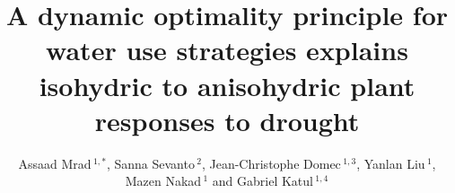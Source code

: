 \documentclass[utf8]{frontiersSCNS} %
\def\firstAuthorLast{Mrad {et~al.}} %
\def\Authors{Assaad Mrad\,$^{1,*}$, Sanna Sevanto\,$^{2}$, Jean-Christophe Domec\,$^{1,3}$, Yanlan Liu\,$^{1}$, Mazen Nakad\,$^{1}$ and Gabriel Katul\,$^{1,4}$}
\begin{document}
\onecolumn
{}

\title[Dynamic optimality principle for water use strategies]{A dynamic optimality principle for water use strategies explains isohydric to anisohydric plant responses to drought} 

\author[\firstAuthorLast ]{\Authors} %
\address{} %
\correspondance{} %

\extraAuth{}%


\maketitle
\end{document}
